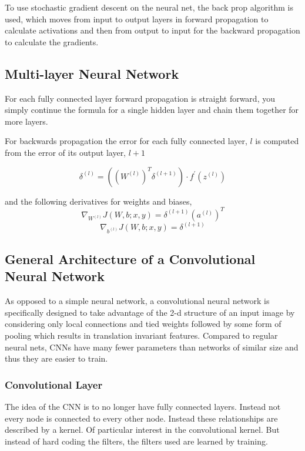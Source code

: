 \documentclass[12pt, twocolumn]{article}
\begin{document}
To use stochastic gradient descent  on the neural net, the back prop algorithm is used, which moves from input to output layers in forward propagation to calculate activations and then from output to input for the backward propagation to calculate the gradients. 


\subsection{Multi-layer Neural Network}
For each fully connected layer forward propagation is straight forward, you simply continue the formula for a single hidden layer and chain them together for more layers. 

For backwards propagation the error for each fully connected layer, $l$ is computed from the error of its output layer, $l+1$  

\begin{equation}
\delta^{(l)}=((W^{(l)})^T \delta^{(l+1)}) \cdot f ^{\prime} (z^{(l)})
\end{equation}

and the following derivatives for weights and biases, 
\begin{equation}
\nabla_{W^{(l)}}J(W,b;x,y) = \delta^{(l+1)}(a^{(l)})^T
\end{equation}
\begin{equation}
\nabla_{b^{(l)}}J(W,b;x,y)= \delta^{(l+1)}
\end{equation}



\subsection{General Architecture of a Convolutional Neural Network}
As opposed to a simple neural network, a convolutional neural network is specifically designed to take advantage of the 2-d structure of an input image by considering only local connections and tied weights followed by some form of pooling which results in translation invariant features. Compared to regular neural nets,  CNNs  have many fewer parameters than networks of similar size and thus they are easier to train.



\subsubsection{Convolutional Layer}
The idea of the CNN is to no longer have fully connected layers. Instead not every node is connected to every other node. Instead these relationships are described by a kernel. Of particular interest in the convolutional kernel. But instead of hard coding the filters, the filters used are learned by training. 
\end{document}
